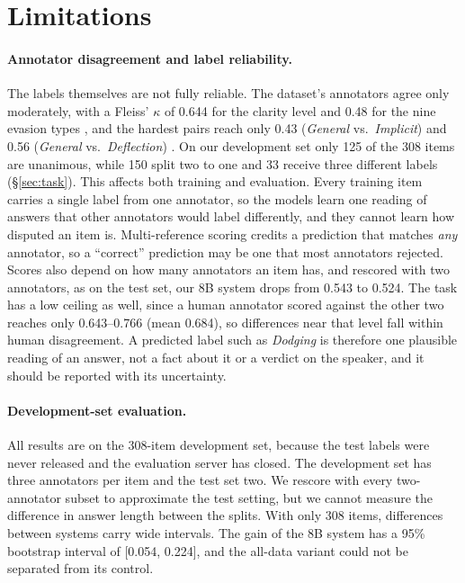 \section*{Limitations}

\paragraph{Annotator disagreement and label reliability.}
The labels themselves are not fully reliable.
The dataset's annotators agree only moderately, with a Fleiss' $\kappa$ of 0.644 for the clarity level and 0.48 for the nine evasion types \citep{thomas-etal-2024-never}, and the hardest pairs reach only 0.43 (\emph{General} vs.\ \emph{Implicit}) and 0.56 (\emph{General} vs.\ \emph{Deflection}) \citep{thomas-etal-2026-semeval}.
On our development set only 125 of the 308 items are unanimous, while 150 split two to one and 33 receive three different labels (\S\ref{sec:task}).
This affects both training and evaluation.
Every training item carries a single label from one annotator, so the models learn one reading of answers that other annotators would label differently, and they cannot learn how disputed an item is.
Multi-reference scoring credits a prediction that matches \emph{any} annotator, so a ``correct'' prediction may be one that most annotators rejected.
Scores also depend on how many annotators an item has, and rescored with two annotators, as on the test set, our 8B system drops from 0.543 to 0.524.
The task has a low ceiling as well, since a human annotator scored against the other two reaches only 0.643--0.766 (mean 0.684), so differences near that level fall within human disagreement.
A predicted label such as \emph{Dodging} is therefore one plausible reading of an answer, not a fact about it or a verdict on the speaker, and it should be reported with its uncertainty.

\paragraph{Development-set evaluation.}
All results are on the 308-item development set, because the test labels were never released and the evaluation server has closed.
The development set has three annotators per item and the test set two.
We rescore with every two-annotator subset to approximate the test setting, but we cannot measure the difference in answer length between the splits.
With only 308 items, differences between systems carry wide intervals.
The gain of the 8B system has a 95\% bootstrap interval of [0.054, 0.224], and the all-data variant could not be separated from its control.

